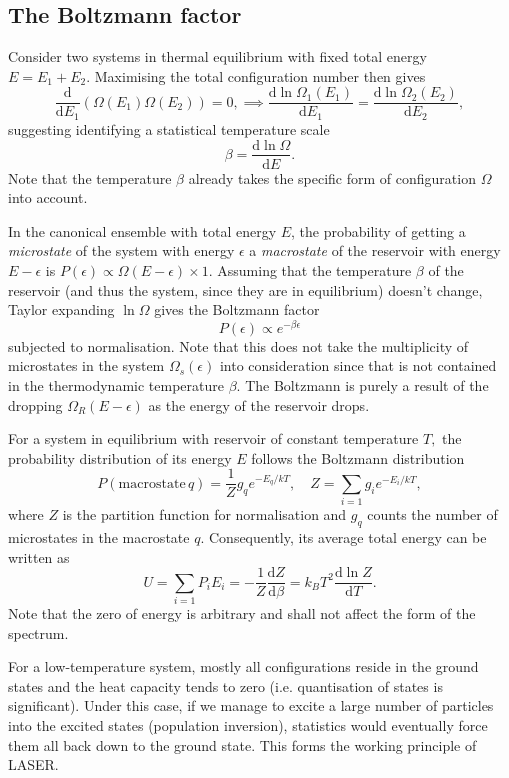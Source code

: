 \documentclass{article}
\theoremstyle{nonumberplain}
\begin{document}
\subsection{The Boltzmann factor}
Consider two systems in thermal equilibrium with fixed total energy $E = E_1 + E_2.$ Maximising the total configuration number then gives 
\[
    \frac{\mathrm{d}}{\mathrm{d}E_1} (\Omega(E_1) \Omega(E_2)) = 0, 
    \implies  
    \frac{\mathrm{d}\ln \Omega_1 (E_1)}{\mathrm{d} E_1} =\frac{\mathrm{d}\ln \Omega_2 (E_2)}{\mathrm{d} E_2},
\]
suggesting identifying a statistical temperature scale
\[
    \boxed{\beta = \frac{\mathrm{d}\ln \Omega}{\mathrm{d} E}. }
\]
Note that the temperature $\beta$ already takes the specific form of configuration $\Omega$ into account. 

In the canonical ensemble with total energy $E$, the probability of getting a \textit{microstate} of the system with energy $\epsilon $ a \textit{macrostate} of the reservoir with energy $E - \epsilon$ is $P(\epsilon ) \propto \Omega(E-\epsilon )\times 1.$ Assuming that the temperature $\beta$ of the reservoir (and thus the system, since they are in equilibrium) doesn't change, Taylor expanding $\ln{\Omega}$ gives the Boltzmann factor 
\[
    \boxed{ P(\epsilon ) \propto e^{-\beta \epsilon}}
\]
subjected to normalisation. Note that this does not take the multiplicity of microstates in the system $\Omega_s(\epsilon)$ into consideration since that is not contained in the thermodynamic temperature $\beta.$ The Boltzmann is purely a result of the dropping $\Omega_R(E- \epsilon)$ as the energy of the reservoir drops. 

For a system in equilibrium with reservoir of constant temperature $T,$ the probability distribution of its energy $E$ follows the Boltzmann distribution
\begin{equation*}
    \boxed{
    P(\mathrm{macrostate} \, q) = \frac{1}{Z} g_q e^{-E_q / k T}, \quad 
    Z = \sum_{i=1} g_i e^{-E_i / kT}, }
\end{equation*}
where $Z$ is the partition function for normalisation and $g_q$ counts the number of microstates in the macrostate $q.$ Consequently, its average total energy can be written as
\[
    U = \sum_{i=1}^{} P_i E_i = -\frac{1}{Z}\frac{\mathrm{d}Z}{\mathrm{d}\beta }
    = k_B T^2 \frac{\mathrm{d}\ln Z}{\mathrm{d}T} . 
\]
Note that the zero of energy is arbitrary and shall not affect the form of the spectrum. 

For a low-temperature system, mostly all configurations reside in the ground states and the heat capacity tends to zero (i.e. quantisation of states is significant). Under this case, if we manage to excite a large number of particles into the excited states (population inversion), statistics would eventually force them all back down to the ground state. This forms the working principle of LASER. 
\end{document}
